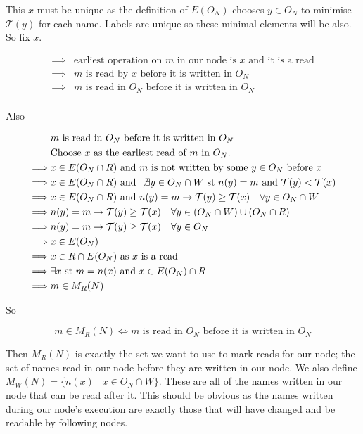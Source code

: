 \documentclass[twoside,a4paper]{report}
\begin{document}
This $x$ must be unique as the definition of $E(O_N)$ chooses $y \in O_N$ to minimise $\mathcal{T}(y)$ for each name. Labels are unique so these minimal elements
will be also. So fix $x$.

\begin{align*}
\implies & \text{earliest operation on $m$ in our node is $x$ and it is a read} \\
\implies & \text{$m$ is read by $x$ before it is written in $O_N$} \\
\implies & \text{$m$ is read in $O_N$ before it is written in $O_N$} \\
\end{align*}

Also

\begin{align*}
         & \text{$m$ is read in $O_N$ before it is written in $O_N$} \\
         & \text{Choose $x$ as the earliest read of $m$ in $O_N$.} \\
\implies & x \in E(O_N \cap R) \text{ and $m$ is not written by some $y \in O_N$ before $x$} \\
\implies & x \in E(O_N \cap R) \text{ and } \not \exists y \in O_N \cap W \text{ st } n(y) = m \text{ and } \mathcal{T}(y) < \mathcal{T}(x) \\
\implies & x \in E(O_N \cap R) \text{ and } n(y) = m \rightarrow \mathcal{T}(y) \ge \mathcal{T}(x) \quad \forall y \in O_N \cap W \\
\implies & n(y) = m \rightarrow \mathcal{T}(y) \ge \mathcal{T}(x) \quad \forall y \in (O_N \cap W) \cup (O_N \cap R) \\
\implies & n(y) = m \rightarrow \mathcal{T}(y) \ge \mathcal{T}(x) \quad \forall y \in O_N \\
\implies & x \in E(O_N) \\
\implies & x \in R \cap E(O_N) \text{ as $x$ is a read} \\
\implies & \exists x \text{ st } m = n(x) \text{ and } x \in E(O_N) \cap R \\
\implies & m \in M_R(N)
\end{align*}

So

$$m \in M_R(N) \Leftrightarrow \text{$m$ is read in $O_N$ before it is written in $O_N$}$$

Then $M_R(N)$ is exactly the set we want to use to mark reads for our node; the set of names read in our node before they are written in our node. We also define
$M_W(N) = \{n(x) \mid x \in O_N \cap W \}$. These are all of the names written in our node that can be read after it. This should be obvious as the names written
during our node's execution are exactly those that will have changed and be readable by following nodes.
\end{document}

